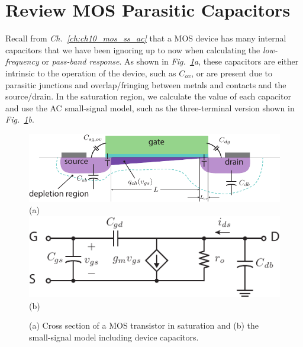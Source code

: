 \section{Review MOS Parasitic Capacitors}
Recall from \emph{Ch.~\ref{ch:ch10_mos_ss_ac}} that a MOS device has many internal capacitors that we have been ignoring up to now when calculating the \textit{low-frequency} or \textit{pass-band response}.  As shown in \emph{Fig.~\ref{fig:mos_caps_xsect}a}, these capacitors are either intrinsic to the operation of the device, such as $C_{ox}$, or are present due to parasitic junctions and overlap/fringing between metals and contacts and the source/drain.  In the saturation region, we calculate the value of each capacitor and use the AC small-signal model, such as the three-terminal version shown in \emph{Fig.~\ref{fig:mos_caps_xsect}b}.
\vspace{0.5cm}
\begin{figure}[H]
\centering
\includegraphics[width=.65\columnwidth]{mos_caps_xsect}\\
(a)\\[0.5cm]
\includegraphics[width=.65\columnwidth]{mos3term_ac.pdf}\\
(b)\\
\caption{(a) Cross section of a MOS transistor in saturation and (b) the small-signal model including device capacitors.}
\label{fig:mos_caps_xsect}
\end{figure}
\newpage
